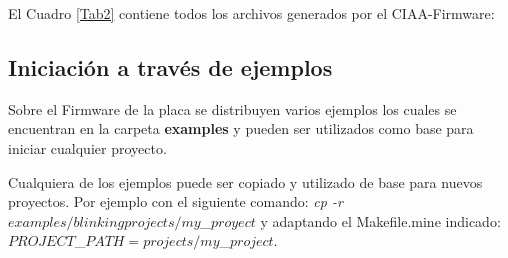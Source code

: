 \documentclass[12pt,letterpaper]{article}
\begin{document}
{\begin{table}
\begin{center}
\caption{Utilidades,archivos,y drivers para la placa}
\label{Tab1}
\end{center}
\end{table}

El Cuadro \ref{Tab2} contiene todos los archivos generados por el CIAA-Firmware:

\begin{table}[h]
\begin{center}
\caption{Descripción de archivos generados en un proyecto en RTOS.}
\label{Tab2}
\end{center}
\end{table}

}
\subsection{Iniciación a través de ejemplos}
Sobre el Firmware de la placa se distribuyen varios ejemplos los cuales se encuentran en la carpeta \textbf{examples} y pueden ser utilizados como base para iniciar cualquier proyecto.

Cualquiera de los ejemplos puede ser copiado y utilizado de base para nuevos proyectos. Por ejemplo con el siguiente comando:	\textit{cp -r $examples/blinking projects/my$\_$proyect$} y adaptando el Makefile.mine indicado: $PROJECT$\_$PATH = projects/my$\_$project$.
\end{document}
